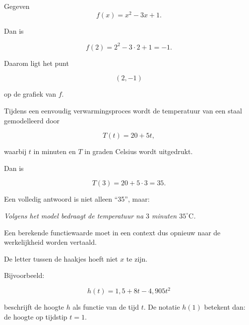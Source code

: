 \documentclass{ximera}
\begin{document}
\begin{voorbeeld}

Gegeven
\[
f(x)=x^2-3x+1.
\]

Dan is

\[
f(2)=2^2-3\cdot 2+1=-1.
\]

Daarom ligt het punt

\[
(2,-1)
\]

op de grafiek van \(f\).
\end{voorbeeld}

\begin{center}
\end{center}

\begin{voorbeeld}

Tijdens een eenvoudig verwarmingsproces wordt de temperatuur van een staal
gemodelleerd door

\[
T(t)=20+5t,
\]

waarbij \(t\) in minuten en \(T\) in graden Celsius wordt uitgedrukt.

Dan is

\[
T(3)=20+5\cdot3=35.
\]

Een volledig antwoord is niet alleen ``35'', maar:

\begin{center}
\emph{Volgens het model bedraagt de temperatuur na \(3\) minuten \(35^\circ\mathrm{C}\).}
\end{center}

Een berekende functiewaarde moet in een context dus opnieuw naar de
werkelijkheid worden vertaald.
\end{voorbeeld}

\begin{opmerking}
De letter tussen de haakjes hoeft niet \(x\) te zijn.

Bijvoorbeeld:

\[
h(t)=1{,}5+8t-4{,}905t^2
\]

beschrijft de hoogte \(h\) als functie van de tijd \(t\).
De notatie \(h(1)\) betekent dan: de hoogte op tijdstip \(t=1\).
\end{opmerking}
\end{document}
